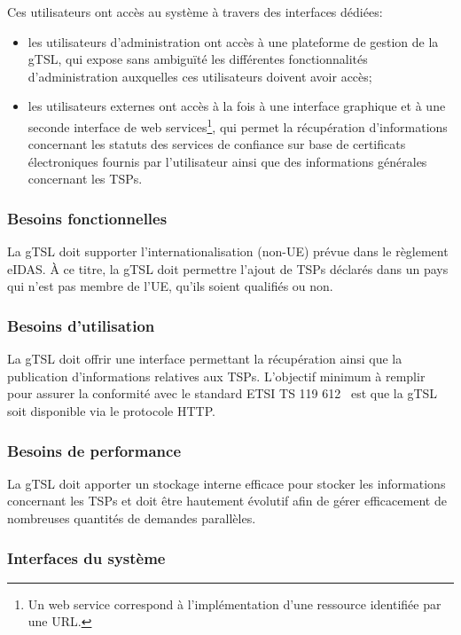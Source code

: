 \documentclass{tnreport}
\begin{document}
Ces utilisateurs ont accès au système à travers des interfaces dédiées:
\begin{itemize}
	\item les utilisateurs d'administration ont accès à une plateforme de gestion de la gTSL, qui expose sans ambiguïté les différentes fonctionnalités d'administration auxquelles ces utilisateurs doivent avoir accès;
	\item les utilisateurs externes ont accès à la fois à une interface graphique et à une seconde interface de web services\footnote{Un web service correspond à l'implémentation d'une ressource identifiée par une URL.}, qui permet la récupération d'informations concernant les statuts des services de confiance sur base de certificats électroniques fournis par l'utilisateur ainsi que des informations générales concernant les TSPs.
\end{itemize}

\subsubsection{Besoins fonctionnelles}

La gTSL doit supporter l'internationalisation (non-UE) prévue dans le règlement eIDAS. À ce titre, la gTSL doit permettre l'ajout de TSPs déclarés dans un pays qui n'est pas membre de l'UE, qu'ils soient qualifiés ou non.

\subsubsection{Besoins d'utilisation}

La gTSL doit offrir une interface permettant la récupération ainsi que la publication d'informations relatives aux TSPs. L'objectif minimum à remplir pour assurer la conformité avec le standard ETSI TS 119 612~\cite{ETSITS119612} est que la gTSL soit disponible via le protocole HTTP.

\subsubsection{Besoins de performance}

La gTSL doit apporter un stockage interne efficace pour stocker les informations concernant les TSPs et doit être hautement évolutif afin de gérer efficacement de nombreuses quantités de demandes parallèles.

\subsubsection{Interfaces du système}
\end{document}
